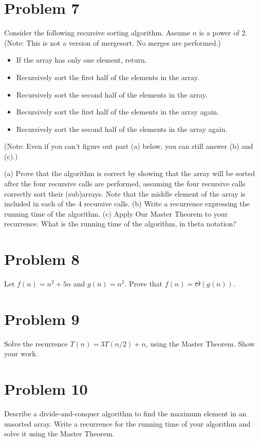 \documentclass{article}
\begin{document}
\section*{Problem 7}
Consider the following recursive sorting algorithm. Assume $n$ is a power of 2. (Note: This is not a version of mergesort. No merges are performed.)

\begin{itemize}
    \item If the array has only one element, return.
    \item Recursively sort the first half of the elements in the array.
    \item Recursively sort the second half of the elements in the array.
    \item Recursively sort the first half of the elements in the array again.
    \item Recursively sort the second half of the elements in the array again.
\end{itemize}
(Note: Even if you can’t figure out part (a) below, you can still answer (b) and (c).)

(a) Prove that the algorithm is correct by showing that the array will be sorted after the four recursive calls are performed, assuming the four recursive calls correctly sort their (sub)arrays. Note that the middle element of the array is included in each of the 4 recursive calls.
(b) Write a recurrence expressing the running time of the algorithm.
(c) Apply Our Master Theorem to your recurrence. What is the running time of the algorithm, in theta notation?

\section*{Problem 8}
Let $f(n) = n^2 + 5n$ and $g(n) = n^2$.  Prove that $f(n) = \Theta(g(n))$.

\section*{Problem 9}
Solve the recurrence $T(n) = 3T(n/2) + n$, using the Master Theorem.  Show your work.

\section*{Problem 10}
Describe a divide-and-conquer algorithm to find the maximum element in an unsorted array. Write a recurrence for the running time of your algorithm and solve it using the Master Theorem.
\end{document}
